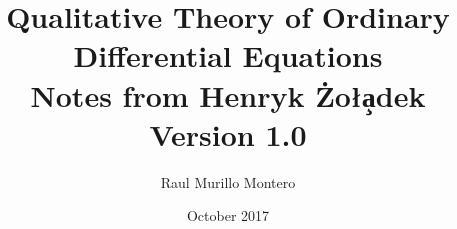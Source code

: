 \documentclass[a4paper,12pt]{book}
\theoremstyle{plain}
\theoremstyle{definition}
\theoremstyle{remark}
\begin{document}
\author{Raul Murillo Montero}
\title{Qualitative Theory of Ordinary Differential Equations\\
\Large   Notes from Henryk Żoł\c{a}dek\\
\large   Version 1.0}
\date{October 2017}

\frontmatter

\tableofcontents

\mainmatter








\backmatter


\end{document}
